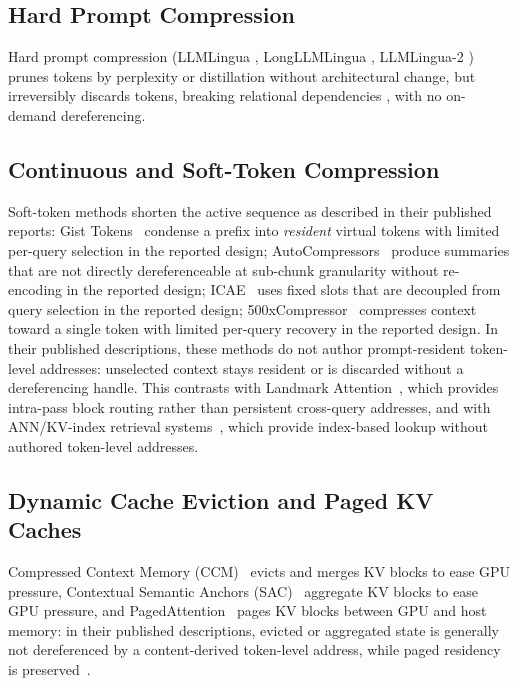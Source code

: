\documentclass[runningheads]{llncs}
\begin{document}
\subsection{Hard Prompt Compression}
Hard prompt compression (LLMLingua \cite{jiang2023llmlingua}, LongLLMLingua \cite{jiang2024longllmlingua}, LLMLingua-2 \cite{pan2024llmlingua2}) prunes tokens by perplexity or distillation without architectural change, but irreversibly discards tokens, breaking relational dependencies \cite{lajewska2025preservation}, with no on-demand dereferencing.

\subsection{Continuous and Soft-Token Compression}
Soft-token methods shorten the active sequence as described in their published reports: Gist Tokens~\cite{mu2023gist} condense a prefix into \emph{resident} virtual tokens with limited per-query selection in the reported design; AutoCompressors~\cite{chevalier2023autocompressors} produce summaries that are not directly dereferenceable at sub-chunk granularity without re-encoding in the reported design; ICAE~\cite{ge2024icae} uses fixed slots that are decoupled from query selection in the reported design; 500xCompressor~\cite{li2025500xcompressor} compresses context toward a single token with limited per-query recovery in the reported design. In their published descriptions, these methods do not author prompt-resident token-level addresses: unselected context stays resident or is discarded without a dereferencing handle. This contrasts with Landmark Attention~\cite{mohtashami2023landmark}, which provides intra-pass block routing rather than persistent cross-query addresses, and with ANN/KV-index retrieval systems~\cite{liu2025retrievalattention, tang2024quest}, which provide index-based lookup without authored token-level addresses.

\subsection{Dynamic Cache Eviction and Paged KV Caches}
Compressed Context Memory (CCM)~\cite{kim2024ccm} evicts and merges KV blocks to ease GPU pressure, Contextual Semantic Anchors (SAC)~\cite{liu2025sac} aggregate KV blocks to ease GPU pressure, and PagedAttention~\cite{kwon2023pagedattention} pages KV blocks between GPU and host memory: in their published descriptions, evicted or aggregated state is generally not dereferenced by a content-derived token-level address, while paged residency is preserved~\cite{kwon2023pagedattention}.
\end{document}
